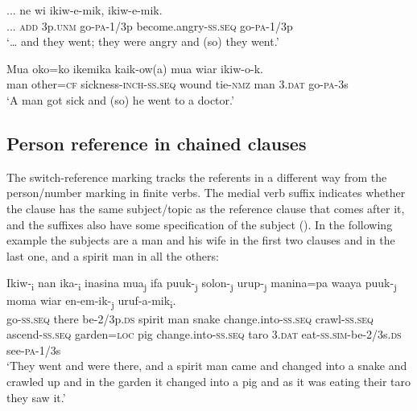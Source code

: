 \ea%
\label{ex:x1441}
\gll ...  ne  wi  ikiw-e-mik,    ikiw-e-mik. \\
...  \textsc{add} 3p.\textsc{unm} go-\textsc{pa}-1/3p become.angry-\textsc{ss}.\textsc{seq} go-\textsc{pa}-1/3p\\
\glt`{\dots} and they went; they were angry and (so) they went.'
\z


\ea%
\label{ex:x1484}
\gll Mua  oko=ko    ikemika  kaik-ow(a)  mua wiar  ikiw-o-k.\\
man  other=\textsc{cf} sickness-\textsc{inch}-\textsc{ss}.\textsc{seq} wound tie-\textsc{nmz} man 3.\textsc{dat} go-\textsc{pa}-3s\\
\glt`A man got sick and (so) he went to a doctor.'
\z


\subsection{Person reference in chained clauses}

The switch-reference marking tracks the referents in a different way from the person/number marking in finite verbs. The medial verb suffix indicates whether the clause has the same subject/topic as the reference clause that comes after it, and the  suffixes also have some specification of the subject (). In the following example the subjects are a man and his wife in the first two clauses and in the last one, and a spirit man in all the others:

\ea%
\label{ex:x1436}
\gll Ikiw-\textsubscript{i}  nan  ika-\textsubscript{i}  inasina  mua\textsubscript{j}  ifa  puuk-\textsubscript{j}  solon-\textsubscript{j}  urup-\textsubscript{j}  manina=pa  waaya puuk-\textsubscript{j}  moma  wiar  en-em-ik-\textsubscript{j} uruf-a-mik\textsubscript{i}.\\
go-\textsc{ss}.\textsc{seq} there be-2/3p.\textsc{ds} spirit  man  snake change.into-\textsc{ss}.\textsc{seq} crawl-\textsc{ss}.\textsc{seq} ascend-\textsc{ss}.\textsc{seq} garden=\textsc{loc} pig change.into-\textsc{ss}.\textsc{seq} taro 3.\textsc{dat} eat-\textsc{ss}.\textsc{sim}-be-2/3s.\textsc{ds} see-\textsc{pa}-1/3s\\
\glt`They went and were there, and a spirit man came and changed into a snake and crawled up and in the garden it changed into a pig and as it was eating their taro they saw it.'
\z


